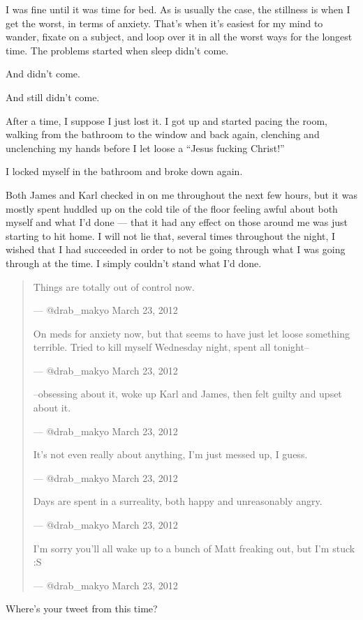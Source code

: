 \begin{paracol}{2}
\begin{leftcolumn}
I was fine until it was time for bed. As is usually the case, the stillness is when I get the worst, in terms of anxiety. That's when it's easiest for my mind to wander, fixate on a subject, and loop over it in all the worst ways for the longest time. The problems started when sleep didn't come.

And didn't come.

And still didn't come.

After a time, I suppose I just lost it. I got up and started pacing the room, walking from the bathroom to the window and back again, clenching and unclenching my hands before I let loose a ``Jesus fucking Christ!''

I locked myself in the bathroom and broke down again.

Both James and Karl checked in on me throughout the next few hours, but it was mostly spent huddled up on the cold tile of the floor feeling awful about both myself and what I'd done --- that it had any effect on those around me was just starting to hit home. I will not lie that, several times throughout the night, I wished that I had succeeded in order to not be going through what I was going through at the time. I simply couldn't stand what I'd done.
\newpage

\begin{quotation}
  Things are totally out of control now.

--- @drab\_makyo March 23, 2012

On meds for anxiety now, but that seems to have just let loose something terrible. Tried to kill myself Wednesday night, spent all tonight--

--- @drab\_makyo March 23, 2012

--obsessing about it, woke up Karl and James, then felt guilty and upset about it.

--- @drab\_makyo March 23, 2012

It's not even really about anything, I'm just messed up, I guess.

--- @drab\_makyo March 23, 2012

Days are spent in a surreality, both happy and unreasonably angry.

--- @drab\_makyo March 23, 2012

I'm sorry you'll all wake up to a bunch of Matt freaking out, but I'm stuck :S

--- @drab\_makyo March 23, 2012
\end{quotation}

\begin{ally}
Where's your tweet from this time?
\end{ally}


\end{leftcolumn}
\end{paracol}
